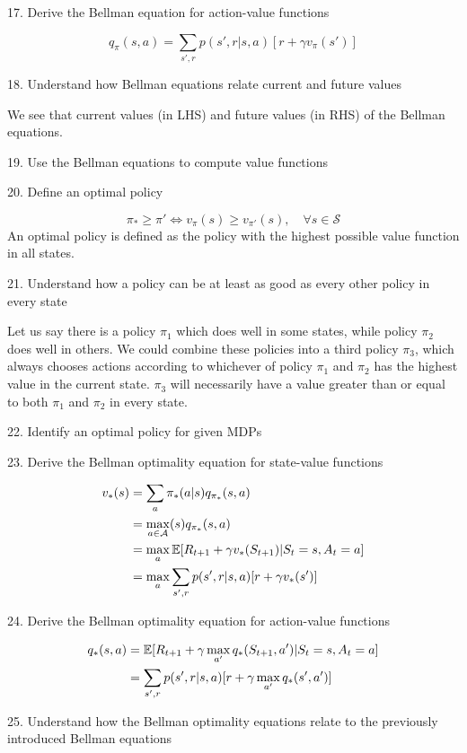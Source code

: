 \documentclass[sutton_barto_notes.tex]{subfiles}
\begin{document}
17. Derive the Bellman equation for action-value functions

$$ q_\pi(s,a) = \sum_{s', r} p(s',r|s,a) [r+\gamma v_\pi(s')] $$

18. Understand how Bellman equations relate current and future values

We see that current values (in LHS) and future values (in RHS) of the Bellman equations.

19. Use the Bellman equations to compute value functions

20. Define an optimal policy

$$ \pi_* \geq \pi' \iff v_\pi(s) \geq v_{\pi'}(s), \quad \forall s \in \mathcal{S} $$
An optimal policy is defined as the policy with the highest possible value function in all states.

21. Understand how a policy can be at least as good as every other policy in every state

Let us say there is a policy $\pi_1$ which does well in some states, while policy $\pi_2$ does well in others. We could combine these policies into a third policy $\pi_3$, which always chooses actions according to whichever of policy $\pi_1$ and $\pi_2$ has the highest value in the current state. $\pi_3$ will necessarily have a value greater than or equal to both $\pi_1$ and $\pi_2$ in every state.

22. Identify an optimal policy for given MDPs

23. Derive the Bellman optimality equation for state-value functions

\begin{align*}
v_*(s) &= \sum_a \pi_* (a|s) q_{\pi_*} (s,a) \\
& = \max_{a\in\mathcal{A}}(s) q_{\pi_*} (s,a) \\
& = \max_a \operatorname*{\mathbb{E}} [R_{t+1} + \gamma v_* (S_{t+1}) | S_t = s, A_t = a] \\
& = \max_a \sum_{s',r} p(s',r|s,a)[r+\gamma v_*(s')]
\end{align*}

24. Derive the Bellman optimality equation for action-value functions

\begin{align*}
q_*(s,a) & = \operatorname*{\mathbb{E}} [R_{t+1} + \gamma \max_{a'} q_*(S_{t+1}, a') | S_t = s, A_t = a] \\
& = \sum_{s',r} p(s',r|s,a)[r+\gamma \max_{a'} q_*(s',a')]
\end{align*}

25. Understand how the Bellman optimality equations relate to the previously introduced Bellman equations
\end{document}
